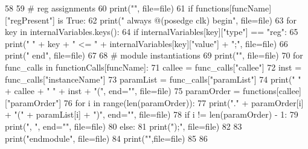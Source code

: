 \begin{DoxyCode}
58 
59         \textcolor{comment}{# reg assignments
}
60         print(\textcolor{stringliteral}{""}, file=file)
61         \textcolor{keywordflow}{if} functions[funcName][\textcolor{stringliteral}{"regPresent"}] \textcolor{keywordflow}{is} \textcolor{keyword}{True}:
62             print(\textcolor{stringliteral}{"    always @(posedge clk) begin"}, file=file)
63             \textcolor{keywordflow}{for} key \textcolor{keywordflow}{in} internalVariables.keys():
64                 \textcolor{keywordflow}{if} internalVariables[key][\textcolor{stringliteral}{"type"}] == \textcolor{stringliteral}{"reg"}:
65                     print(\textcolor{stringliteral}{"        "} + key + \textcolor{stringliteral}{" <= "} + internalVariables[key][\textcolor{stringliteral}{"value"}] + \textcolor{stringliteral}{";"}, file=file)
66             print(\textcolor{stringliteral}{"    end"}, file=file)
67 
68         \textcolor{comment}{# module instantiations
}
69         print(\textcolor{stringliteral}{""}, file=file)
70         \textcolor{keywordflow}{for} func\_calls \textcolor{keywordflow}{in} functionCalls[funcName]:
71             callee = func\_calls[\textcolor{stringliteral}{"callee"}]
72             inst = func\_calls[\textcolor{stringliteral}{"instanceName"}]
73             paramList = func\_calls[\textcolor{stringliteral}{"paramList"}]
74             print(\textcolor{stringliteral}{"    "} + callee + \textcolor{stringliteral}{" "} + inst + \textcolor{stringliteral}{"("}, end=\textcolor{stringliteral}{""}, file=file)
75             paramOrder = functions[callee][\textcolor{stringliteral}{"paramOrder"}]
76             \textcolor{keywordflow}{for} i \textcolor{keywordflow}{in} range(len(paramOrder)):
77                 print(\textcolor{stringliteral}{"."} + paramOrder[i] + \textcolor{stringliteral}{"("} + paramList[i] + \textcolor{stringliteral}{")"}, end=\textcolor{stringliteral}{""}, file=file)
78                 \textcolor{keywordflow}{if} i != len(paramOrder) - 1:
79                     print(\textcolor{stringliteral}{", "}, end=\textcolor{stringliteral}{""}, file=file)
80                 \textcolor{keywordflow}{else}:
81                     print(\textcolor{stringliteral}{");"}, file=file)
82 
83         print(\textcolor{stringliteral}{"endmodule"}, file=file)
84         print(\textcolor{stringliteral}{""},file=file)
85 
86 
\end{DoxyCode}

